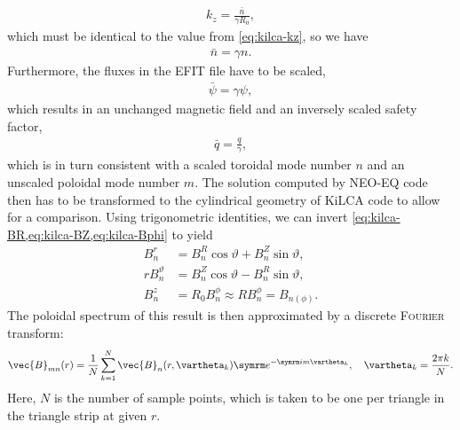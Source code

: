 \begin{gather}
  k_{z} = \frac{\bar{n}}{\gamma R_{0}},
\end{gather}
which must be identical to the value from \cref{eq:kilca-kz}, so we have
\begin{gather}
  \bar{n} = \gamma n.
\end{gather}
Furthermore, the fluxes in the EFIT file have to be scaled,
\begin{gather}
  \bar{\psi} = \gamma \psi,
\end{gather}
which results in an unchanged magnetic field and an inversely scaled safety factor,
\begin{gather}
  \bar{q} = \frac{q}{\gamma},
\end{gather}
which is in turn consistent with a scaled toroidal mode number $n$ and an unscaled poloidal mode number $m$. The solution computed by NEO-EQ code then has to be transformed to the cylindrical geometry of KiLCA code to allow for a comparison. Using trigonometric identities, we can invert \cref{eq:kilca-BR,eq:kilca-BZ,eq:kilca-Bphi} to yield
\begin{align}
  B_{n}^{r} &= B_{n}^{R} \cos \vartheta + B_{n}^{Z} \sin \vartheta, \\
  r B_{n}^{\vartheta} &= B_{n}^{Z} \cos \vartheta - B_{n}^{R} \sin \vartheta, \\
  B_{n}^{z} &= R_{0} B_{n}^{\phi} \approx R B_{n}^{\phi} = B_{n (\phi)}.
\end{align}
The poloidal spectrum of this result is then approximated by a discrete \textsc{Fourier} transform:
\begin{gather}
  \vec{B}_{m n} (r) = \frac{1}{N} \sum_{k = 1}^{N} \vec{B}_{n} (r, \vartheta_{k}) \e^{-\im m \vartheta_{k}}, \quad \vartheta_{k} = \frac{2 \pi k}{N}.
\end{gather}
Here, $N$ is the number of sample points, which is taken to be one per triangle in the triangle strip at given $r$.

